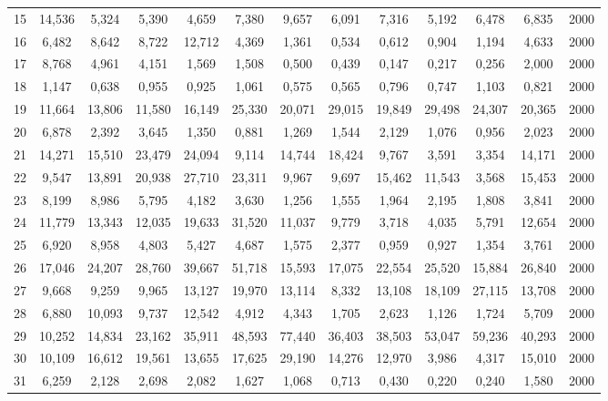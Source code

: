 {\begin{longtable}{ >{\footnotesize}ccccccccccccc}
15  & 14,536 & 5,324  & 5,390  & 4,659  & 7,380  & 9,657  & 6,091  & 7,316  & 5,192  & 6,478  & 6,835  & 2000 \\
16  & 6,482  & 8,642  & 8,722  & 12,712 & 4,369  & 1,361  & 0,534  & 0,612  & 0,904  & 1,194  & 4,633  & 2000 \\
17  & 8,768  & 4,961  & 4,151  & 1,569  & 1,508  & 0,500  & 0,439  & 0,147  & 0,217  & 0,256  & 2,000  & 2000 \\
18  & 1,147  & 0,638  & 0,955  & 0,925  & 1,061  & 0,575  & 0,565  & 0,796  & 0,747  & 1,103  & 0,821  & 2000 \\
19  & 11,664 & 13,806 & 11,580 & 16,149 & 25,330 & 20,071 & 29,015 & 19,849 & 29,498 & 24,307 & 20,365 & 2000 \\
20  & 6,878  & 2,392  & 3,645  & 1,350  & 0,881  & 1,269  & 1,544  & 2,129  & 1,076  & 0,956  & 2,023  & 2000 \\
21  & 14,271 & 15,510 & 23,479 & 24,094 & 9,114  & 14,744 & 18,424 & 9,767  & 3,591  & 3,354  & 14,171 & 2000 \\
22  & 9,547  & 13,891 & 20,938 & 27,710 & 23,311 & 9,967  & 9,697  & 15,462 & 11,543 & 3,568  & 15,453 & 2000 \\
23  & 8,199  & 8,986  & 5,795  & 4,182  & 3,630  & 1,256  & 1,555  & 1,964  & 2,195  & 1,808  & 3,841  & 2000 \\
24  & 11,779 & 13,343 & 12,035 & 19,633 & 31,520 & 11,037 & 9,779  & 3,718  & 4,035  & 5,791  & 12,654 & 2000 \\
25  & 6,920  & 8,958  & 4,803  & 5,427  & 4,687  & 1,575  & 2,377  & 0,959  & 0,927  & 1,354  & 3,761  & 2000 \\
26  & 17,046 & 24,207 & 28,760 & 39,667 & 51,718 & 15,593 & 17,075 & 22,554 & 25,520 & 15,884 & 26,840 & 2000 \\
27  & 9,668  & 9,259  & 9,965  & 13,127 & 19,970 & 13,114 & 8,332  & 13,108 & 18,109 & 27,115 & 13,708 & 2000 \\
28  & 6,880  & 10,093 & 9,737  & 12,542 & 4,912  & 4,343  & 1,705  & 2,623  & 1,126  & 1,724  & 5,709  & 2000 \\
29  & 10,252 & 14,834 & 23,162 & 35,911 & 48,593 & 77,440 & 36,403 & 38,503 & 53,047 & 59,236 & 40,293 & 2000 \\
30  & 10,109 & 16,612 & 19,561 & 13,655 & 17,625 & 29,190 & 14,276 & 12,970 & 3,986  & 4,317  & 15,010 & 2000 \\
31  & 6,259  & 2,128  & 2,698  & 2,082  & 1,627  & 1,068  & 0,713  & 0,430  & 0,220  & 0,240  & 1,580  & 2000 \\

\end{longtable}}

